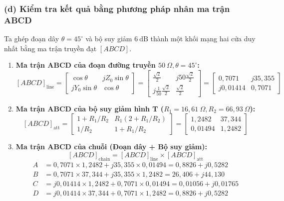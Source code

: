 \documentclass[12pt,a4paper]{article}
\begin{document}
\subsubsection{(d) Kiểm tra kết quả bằng phương pháp nhân ma trận ABCD}
Ta ghép đoạn dây $\theta = 45^\circ$ và bộ suy giảm $6~\text{dB}$ thành một khối mạng hai cửa duy nhất bằng ma trận truyền đạt $[ABCD]$.
\begin{enumerate}
    \item \textbf{Ma trận ABCD của đoạn đường truyền $50~\Omega, \theta = 45^\circ$:}
    \[
    [ABCD]_{\text{line}} = \begin{bmatrix} \cos\theta & jZ_0\sin\theta \\ jY_0\sin\theta & \cos\theta \end{bmatrix} = \begin{bmatrix} \frac{\sqrt{2}}{2} & j50\frac{\sqrt{2}}{2} \\ j\frac{1}{50}\frac{\sqrt{2}}{2} & \frac{\sqrt{2}}{2} \end{bmatrix} = \begin{bmatrix} 0{,}7071 & j35{,}355 \\ j0{,}01414 & 0{,}7071 \end{bmatrix}
    \]
    \item \textbf{Ma trận ABCD của bộ suy giảm hình T ($R_1 = 16{,}61~\Omega, R_2 = 66{,}93~\Omega$):}
    \[
    [ABCD]_{\text{att}} = \begin{bmatrix} 1 + R_1/R_2 & R_1(2 + R_1/R_2) \\ 1/R_2 & 1 + R_1/R_2 \end{bmatrix} = \begin{bmatrix} 1{,}2482 & 37{,}344 \\ 0{,}01494 & 1{,}2482 \end{bmatrix}
    \]
    \item \textbf{Ma trận ABCD của chuỗi (Đoạn dây + Bộ suy giảm):}
    \[
    [ABCD]_{\text{chain}} = [ABCD]_{\text{line}} \times [ABCD]_{\text{att}}
    \]
    \begin{align*}
    A &= 0{,}7071 \times 1{,}2482 + j35{,}355 \times 0{,}01494 = 0{,}8826 + j0{,}5282 \\
    B &= 0{,}7071 \times 37{,}344 + j35{,}355 \times 1{,}2482 = 26{,}406 + j44{,}130 \\
    C &= j0{,}01414 \times 1{,}2482 + 0{,}7071 \times 0{,}01494 = 0{,}01056 + j0{,}01765 \\
    D &= j0{,}01414 \times 37{,}344 + 0{,}7071 \times 1{,}2482 = 0{,}8826 + j0{,}5282
    \end{align*}

\end{enumerate}
\end{document}
